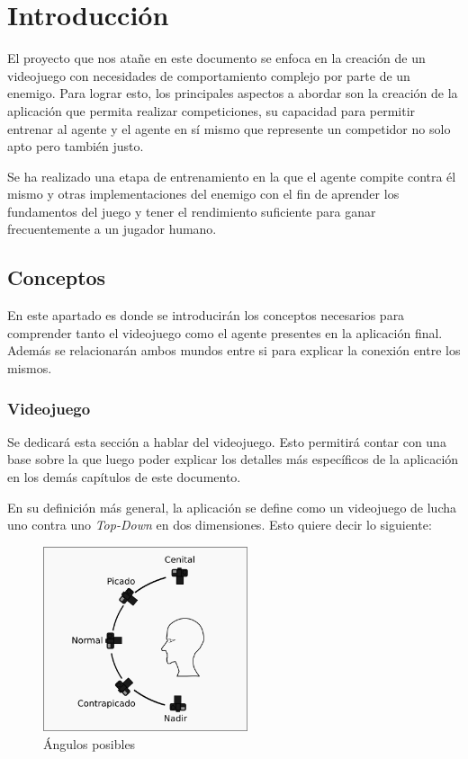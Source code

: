 \chapter{Introducción}

El proyecto que nos atañe en este documento se enfoca en la creación de un videojuego con necesidades de comportamiento complejo por parte de un enemigo. Para lograr esto, los principales aspectos a abordar son la creación de la aplicación que permita realizar competiciones, su capacidad para permitir entrenar al agente y el agente en sí mismo que represente un competidor no solo apto pero también justo.

\bigskip

Se ha realizado una etapa de entrenamiento en la que el agente compite contra él mismo y otras implementaciones del enemigo con el fin de aprender los fundamentos del juego y tener el rendimiento suficiente para ganar frecuentemente a un jugador humano.

\section{Conceptos}

En este apartado es donde se introducirán los conceptos necesarios para comprender tanto el videojuego como el agente presentes en la aplicación final. Además se relacionarán ambos mundos entre si para explicar la conexión entre los mismos.

\subsection{Videojuego}

Se dedicará esta sección a hablar del videojuego. Esto permitirá contar con una base sobre la que luego poder explicar los detalles más específicos de la aplicación en los demás capítulos de este documento.

\bigskip

En su definición más general, la aplicación se define como un videojuego de lucha uno contra uno \textit{Top-Down} en dos dimensiones. Esto quiere decir lo siguiente:

\begin{figure}
	\centerline{\includegraphics[width=6cm]{otros/manual/angulos.png}}
	\caption{Ángulos posibles}
	\label{mec:angulos}
\end{figure}

